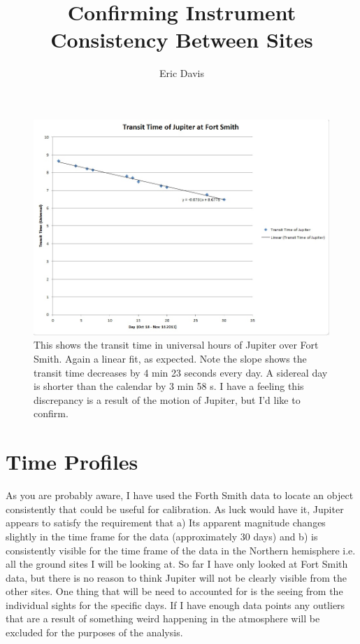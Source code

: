 \documentclass[11pt]{article}
\title{Confirming Instrument Consistency Between Sites}
\author{Eric Davis}
\begin{document}
\maketitle
\medskip



\begin{figure}[h!]
\includegraphics[scale=0.7]{transittimes_plot.jpg}
\caption{This shows the transit time in universal hours of Jupiter over Fort Smith. Again a linear fit, as expected. Note the slope shows the transit time decreases by 4 min 23 seconds every day. A sidereal day is shorter than the calendar by 3 min 58 s. I have a feeling this discrepancy is a result of the motion of Jupiter, but I'd like to confirm.}
\end{figure}


\section{Time Profiles}
\hspace{0.5cm}

As you are probably aware, I have used the Forth Smith data to locate an object consistently that could be useful for calibration. As luck would have it, Jupiter appears to satisfy the requirement that a) Its apparent magnitude changes slightly in the time frame for the data (approximately 30 days) and b) is consistently visible for the time frame of the data in the Northern hemisphere i.e. all the ground sites I will be looking at. So far I have only looked at Fort Smith data, but there is no reason to think Jupiter will not be clearly visible from the other sites. One thing that will be need to accounted for is the seeing from the individual sights for the specific days. If I have enough data points any outliers that are a result of something weird happening in the atmosphere will be excluded for the purposes of the analysis.   
\end{document}
